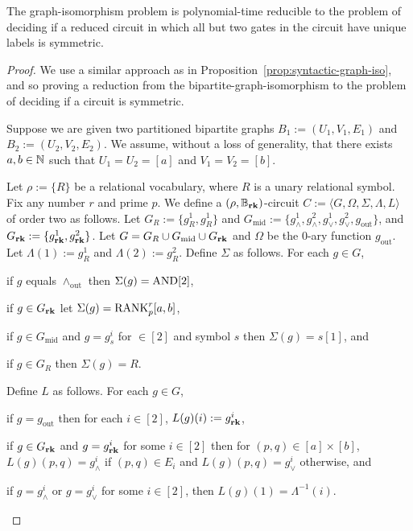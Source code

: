 \documentclass[../paper.tex]{subfiles}
\begin{document}
\begin{prop}
  The graph-isomorphism problem is polynomial-time reducible to the problem of
  deciding if a reduced circuit in which all but two gates in the circuit have
  unique labels is symmetric.
  \label{prop:graph-iso-symmetric}
\end{prop}
\begin{proof}
  We use a similar approach as in Proposition~\ref{prop:syntactic-graph-iso},
  and so proving a reduction from the bipartite-graph-isomorphism to the problem
  of deciding if a circuit is symmetric.
 
  Suppose we are given two partitioned bipartite graphs $B_1 := (U_1, V_1, E_1)$
  and $B_2 := (U_2, V_2, E_2)$. We assume, without a loss of generality, that
  there exists $a, b \in \mathbb{N}$ such that $U_1 = U_2 = [a]$ and $V_1 = V_2 =
  [b]$.

  Let $\rho:= \{R\}$ be a relational vocabulary, where $R$ is a unary relational
  symbol. Fix any number $r$ and prime $p$. We define a $(\rho, \mathbb{B}_{\text{\textbf{rk}}})$-circuit $C
  := \langle G, \Omega, \Sigma, \Lambda, L \rangle$ of order two as follows. Let
  $G_{R} := \{g^1_{R}, g^1_{R}\}$ and $G_{\text{mid}} := \{g^1_{\land},
  g^2_\land, g^1_\lor, g^2_\lor , g_{\text{out}}\}$, and $G_{\text{\textbf{rk}}} : = \{
  g^1_{\text{\textbf{rk}}}, g^2_{\text{\textbf{rk}}}\}$. Let $G = G_R \cup G_{\text{mid}} \cup G_{\text{\textbf{rk}}}$
  and $\Omega$ be the $0$-ary function $g_{\text{out}}$. Let $\Lambda(1) :=
  g^1_{R}$ and $\Lambda(2) := g^2_{R}$. Define $\Sigma$ as follows. For each $g
  \in G$,
  \begin{myitemize}
  \item if $g$ equals $\land_{\text{out}}$ then $\Sigma(g) = \text{\upshape AND}[2]$,
  \item if $g \in G_{\text{\textbf{rk}}}$ let $\Sigma(g) = \text{\upshape RANK}^r_p [a,b]$,
  \item if $g \in G_{\text{mid}}$ and $g = g^i_s$ for $ \in [2]$ and symbol $s$
    then $\Sigma(g) = s[1]$, and
  \item if $g \in G_R$ then $\Sigma(g) = R$.
  \end{myitemize}
  Define $L$ as follows. For each $g \in G$,
  \begin{myitemize}
  \item if $g = g_{\text{out}}$ then for each $i \in [2]$, $L(g)(i) :=
    g^i_{\text{\textbf{rk}}}$,
  \item if $g \in G_{\text{\textbf{rk}}}$ and $g = g^i_{\text{\textbf{rk}}}$ for some $i \in [2]$ then for
    $(p,q) \in [a]\times [b]$, $L(g)(p,q) = g^i_\land$ if $(p,q) \in E_i$ and
    $L(g)(p,q) = g^i_\lor$ otherwise, and
  \item if $g = g^i_\land$ or $g = g^i_{\lor}$ for some $i \in [2]$, then
    $L(g)(1) = \Lambda^{-1}(i)$.
  \end{myitemize}



\end{proof}
\end{document}
